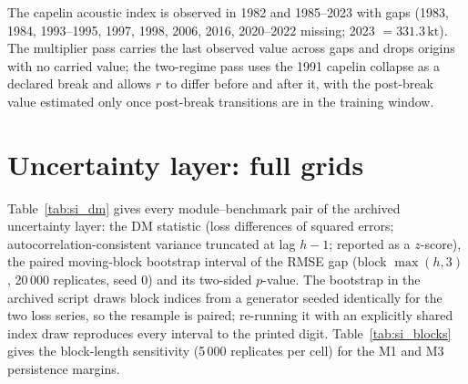 \documentclass[preprint,11pt,authoryear]{elsarticle}
\theoremstyle{remark}
\newcommand{\kt}{\,\mathrm{kt}}
\begin{document}
The capelin acoustic index is observed in 1982 and 1985--2023 with gaps (1983, 1984, 1993--1995, 1997, 1998, 2006, 2016, 2020--2022 missing; 2023 $= 331.3\kt$). The multiplier pass carries the last observed value across gaps and drops origins with no carried value; the two-regime pass uses the 1991 capelin collapse as a declared break and allows $r$ to differ before and after it, with the post-break value estimated only once post-break transitions are in the training window.

\FloatBarrier
\section{Uncertainty layer: full grids}\label{si:uncertainty}

Table~\ref{tab:si_dm} gives every module--benchmark pair of the archived uncertainty layer: the DM statistic (loss differences of squared errors; autocorrelation-consistent variance truncated at lag $h-1$; reported as a $z$-score), the paired moving-block bootstrap interval of the RMSE gap (block $\max(h,3)$, 20\,000 replicates, seed 0) and its two-sided $p$-value. The bootstrap in the archived script draws block indices from a generator seeded identically for the two loss series, so the resample is paired; re-running it with an explicitly shared index draw reproduces every interval to the printed digit. Table~\ref{tab:si_blocks} gives the block-length sensitivity (5\,000 replicates per cell) for the M1 and M3 persistence margins.
\end{document}
